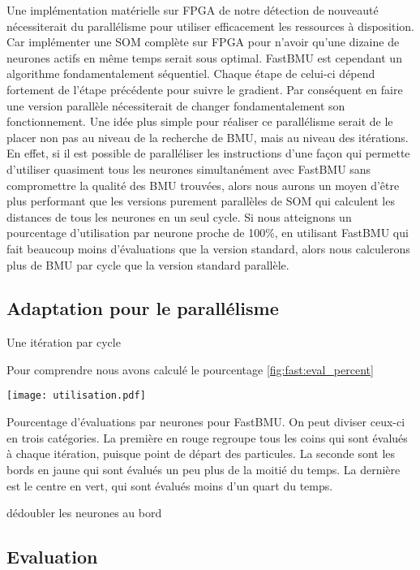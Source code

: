 	Une implémentation matérielle sur FPGA de notre détection de nouveauté nécessiterait du parallélisme pour utiliser efficacement les ressources à disposition. Car implémenter une SOM complète sur FPGA pour n'avoir qu'une dizaine de neurones actifs en même temps serait sous optimal. FastBMU est cependant un algorithme fondamentalement séquentiel. Chaque étape de celui-ci dépend fortement de l'étape précédente pour suivre le gradient. Par conséquent en faire une version parallèle nécessiterait de changer fondamentalement son fonctionnement. Une idée plus simple pour réaliser ce parallélisme serait de le placer non pas au niveau de la recherche de BMU, mais au niveau des itérations. En effet, si il est possible de paralléliser les instructions d'une façon qui permette d'utiliser quasiment tous les neurones simultanément avec FastBMU sans compromettre la qualité des BMU trouvées, alors nous aurons un moyen d'être plus performant que les versions purement parallèles de SOM qui calculent les distances de tous les neurones en un seul cycle. Si nous atteignons un pourcentage d'utilisation par neurone proche de 100\%, en utilisant FastBMU qui fait beaucoup moins d'évaluations que la version standard, alors nous calculerons plus de BMU par cycle que la version standard parallèle.

	\subsection{Adaptation pour le parallélisme}

	Une itération par cycle

	Pour comprendre  nous avons calculé le pourcentage  \ref{fig:fast:eval_percent}

	\begin{figureth}
    	\centering
    	\texttt{[image: utilisation.pdf]}
    	\caption[Pourcentage d'évaluations par neurones pour FastBMU]{Pourcentage d'évaluations par neurones pour FastBMU. On peut diviser ceux-ci en trois catégories. La première en rouge regroupe tous les coins qui sont évalués à chaque itération, puisque point de départ des particules. La seconde sont les bords en jaune qui sont évalués un peu plus de la moitié du temps. La dernière est le centre en vert, qui sont évalués moins d'un quart du temps.}
    	\label{fig:fast:eval_percent}
	\end{figureth}

	dédoubler les neurones au bord

	\subsection{Evaluation}


